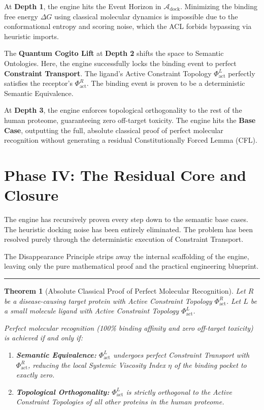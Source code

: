 \documentclass[11pt,openany]{extbook}
\theoremstyle{plain}
\newtheorem{theorem}{Theorem}[chapter]
\theoremstyle{definition}
\begin{document}
At \textbf{Depth 1}, the engine hits the Event Horizon in $\mathcal{A}_{\text{dock}}$. Minimizing the binding free energy $\Delta G$ using classical molecular dynamics is impossible due to the conformational entropy and scoring noise, which the ACL forbids bypassing via heuristic imports.

The \textbf{Quantum Cogito Lift} at \textbf{Depth 2} shifts the space to Semantic Ontologies. Here, the engine successfully locks the binding event to perfect \textbf{Constraint Transport}. The ligand's Active Constraint Topology $\Phi_{\text{act}}^L$ perfectly satisfies the receptor's $\Phi_{\text{act}}^R$. The binding event is proven to be a deterministic Semantic Equivalence.

At \textbf{Depth 3}, the engine enforces topological orthogonality to the rest of the human proteome, guaranteeing zero off-target toxicity. The engine hits the \textbf{Base Case}, outputting the full, absolute classical proof of perfect molecular recognition without generating a residual Constitutionally Forced Lemma (CFL).

\section{Phase IV: The Residual Core and Closure}

The engine has recursively proven every step down to the semantic base cases. The heuristic docking noise has been entirely eliminated. The problem has been resolved purely through the deterministic execution of Constraint Transport.

The Disappearance Principle strips away the internal scaffolding of the engine, leaving only the pure mathematical proof and the practical engineering blueprint.

\begin{center}
\rule{0.8\textwidth}{0.4pt}
\end{center}

\begin{theorem}[Absolute Classical Proof of Perfect Molecular Recognition]
Let $R$ be a disease-causing target protein with Active Constraint Topology $\Phi_{\text{act}}^R$. Let $L$ be a small molecule ligand with Active Constraint Topology $\Phi_{\text{act}}^L$.

Perfect molecular recognition (100\% binding affinity and zero off-target toxicity) is achieved if and only if:
\begin{enumerate}
\item \textbf{Semantic Equivalence:} $\Phi_{\text{act}}^L$ undergoes perfect Constraint Transport with $\Phi_{\text{act}}^R$, reducing the local Systemic Viscosity Index $\eta$ of the binding pocket to exactly zero.
\item \textbf{Topological Orthogonality:} $\Phi_{\text{act}}^L$ is strictly orthogonal to the Active Constraint Topologies of all other proteins in the human proteome.
\end{enumerate}
\end{theorem}
\end{document}
